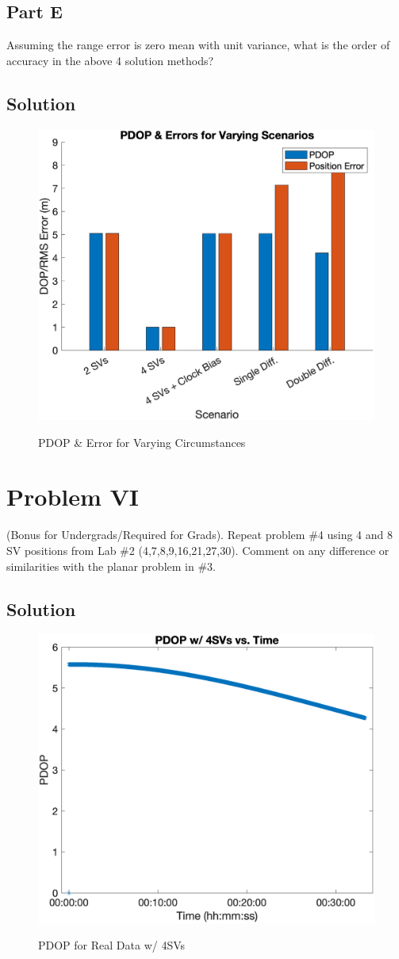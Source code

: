 \documentclass{article}
\begin{document}
\subsection*{Part E}
Assuming the range error is zero mean with unit variance, what is the order of
accuracy in the above 4 solution methods?

\subsection*{Solution}
\begin{figure}[H]
    \centering
    \includegraphics[width=0.75\linewidth]{../figures/p5_pdop.png}\label{fig:p5_pdop}
    \caption{PDOP \& Error for Varying Circumstances}
\end{figure}

\section*{Problem VI}
(Bonus for Undergrads/Required for Grads). Repeat problem \#4 using 4 and 8 SV positions
from Lab \#2 (4,7,8,9,16,21,27,30). Comment on any difference or similarities with the
planar problem in \#3.

\subsection*{Solution}
\begin{figure}[H]
    \centering
    \includegraphics[width=0.75\linewidth]{../figures/p6_4svs_pdop.png}\label{fig:p6_4svs_pdop}
    \caption{PDOP for Real Data w/ 4SVs}
\end{figure}
\end{document}
